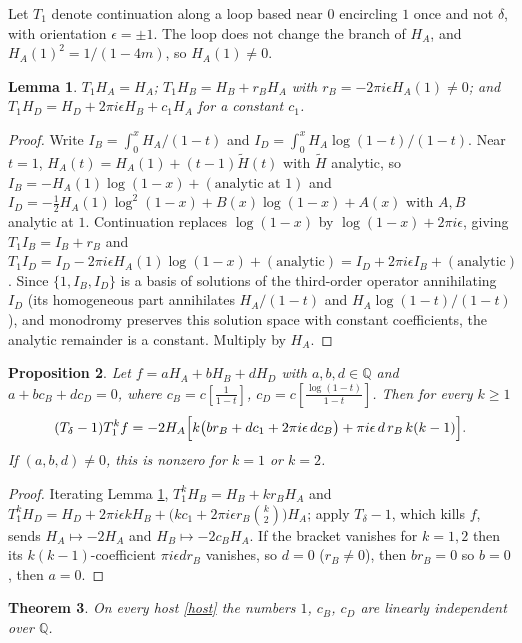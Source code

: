 \documentclass[11pt]{amsart}
\newtheorem{theorem}{Theorem}[section]
\newtheorem{lemma}[theorem]{Lemma}
\newtheorem{proposition}[theorem]{Proposition}
\theoremstyle{remark}
\newcommand{\Q}{\mathbb Q}\newcommand{\Z}{\mathbb Z}\newcommand{\R}{\mathbb R}\newcommand{\C}{\mathbb C}
\begin{document}
Let $T_1$ denote continuation along a loop based near $0$ encircling $1$ once and not $\delta$, with orientation $\epsilon=\pm1$. The loop does not change the branch of $H_A$, and $H_A(1)^2=1/(1-4m)$, so $H_A(1)\ne0$.

\begin{lemma}\label{sheets}
$T_1H_A=H_A$; $T_1H_B=H_B+r_BH_A$ with $r_B=-2\pi i\epsilon H_A(1)\ne0$; and $T_1H_D=H_D+2\pi i\epsilon H_B+c_1H_A$ for a constant $c_1$.
\end{lemma}

\begin{proof}
Write $I_B=\int_0^xH_A/(1-t)$ and $I_D=\int_0^xH_A\log(1-t)/(1-t)$. Near $t=1$, $H_A(t)=H_A(1)+(t-1)\tilde H(t)$ with $\tilde H$ analytic, so $I_B=-H_A(1)\log(1-x)+(\text{analytic at }1)$ and $I_D=-\frac12H_A(1)\log^2(1-x)+B(x)\log(1-x)+A(x)$ with $A,B$ analytic at $1$. Continuation replaces $\log(1-x)$ by $\log(1-x)+2\pi i\epsilon$, giving $T_1I_B=I_B+r_B$ and $T_1I_D=I_D-2\pi i\epsilon H_A(1)\log(1-x)+(\text{analytic})=I_D+2\pi i\epsilon I_B+(\text{analytic})$. Since $\{1,I_B,I_D\}$ is a basis of solutions of the third-order operator annihilating $I_D$ (its homogeneous part annihilates $H_A/(1-t)$ and $H_A\log(1-t)/(1-t)$), and monodromy preserves this solution space with constant coefficients, the analytic remainder is a constant. Multiply by $H_A$.
\end{proof}

\begin{proposition}\label{twosheets}
Let $f=aH_A+bH_B+dH_D$ with $a,b,d\in\Q$ and $a+bc_B+dc_D=0$, where $c_B=c[\frac1{1-t}]$, $c_D=c[\frac{\log(1-t)}{1-t}]$. Then for every $k\ge1$
\[
(T_\delta-1)T_1^kf=-2H_A\Bigl[k\bigl(br_B+dc_1+2\pi i\epsilon\,dc_B\bigr)+\pi i\epsilon\,d\,r_B\,k(k-1)\Bigr].
\]
If $(a,b,d)\ne0$, this is nonzero for $k=1$ or $k=2$.
\end{proposition}

\begin{proof}
Iterating Lemma \ref{sheets}, $T_1^kH_B=H_B+kr_BH_A$ and $T_1^kH_D=H_D+2\pi i\epsilon kH_B+\bigl(kc_1+2\pi i\epsilon r_B\binom k2\bigr)H_A$; apply $T_\delta-1$, which kills $f$, sends $H_A\mapsto-2H_A$ and $H_B\mapsto-2c_BH_A$. If the bracket vanishes for $k=1,2$ then its $k(k-1)$-coefficient $\pi i\epsilon dr_B$ vanishes, so $d=0$ ($r_B\ne0$), then $br_B=0$ so $b=0$, then $a=0$.
\end{proof}

\begin{theorem}\label{main}
On every host \eqref{host} the numbers $1$, $c_B$, $c_D$ are linearly independent over $\Q$.
\end{theorem}
\end{document}
